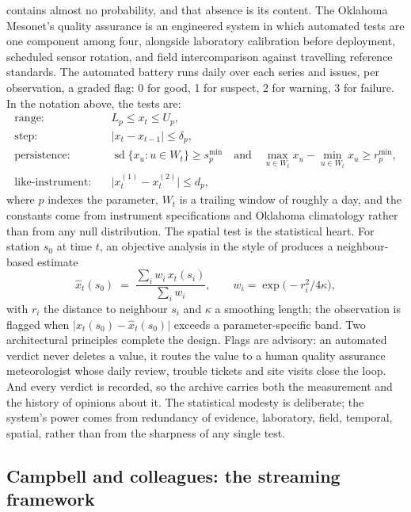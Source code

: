 \citet{shafer2000} contains almost no probability, and that absence is its
content. The Oklahoma Mesonet's quality assurance is an engineered system in
which automated tests are one component among four, alongside laboratory
calibration before deployment, scheduled sensor rotation, and field
intercomparison against travelling reference standards. The automated battery
runs daily over each series and issues, per observation, a graded flag:
0 for good, 1 for suspect, 2 for warning, 3 for failure. In the notation
above, the tests are:
\begin{align}
  \text{range:}\quad & L_p \le x_t \le U_p, \label{eq:range}\\
  \text{step:}\quad & \lvert x_t - x_{t-1} \rvert \le \delta_p, \label{eq:step}\\
  \text{persistence:}\quad & \operatorname{sd}\{x_u : u \in W_t\} \ge
    s^{\min}_p \quad\text{and}\quad
    \max_{u \in W_t} x_u - \min_{u \in W_t} x_u \ge r^{\min}_p,
    \label{eq:persistence}\\
  \text{like-instrument:}\quad & \lvert x^{(1)}_t - x^{(2)}_t \rvert \le d_p,
    \label{eq:like}
\end{align}
where $p$ indexes the parameter, $W_t$ is a trailing window of roughly a
day, and the constants come from instrument specifications and Oklahoma
climatology rather than from any null distribution. The spatial test is the
statistical heart. For station $s_0$ at time $t$, an objective analysis in
the style of \citet{barnes1964} produces a neighbour-based estimate
\begin{equation}
  \hat{x}_t(s_0) \;=\;
  \frac{\sum_{i} w_i\, x_t(s_i)}{\sum_{i} w_i},
  \qquad w_i = \exp\!\big(-r_i^2 / 4\kappa\big),
  \label{eq:barnes}
\end{equation}
with $r_i$ the distance to neighbour $s_i$ and $\kappa$ a smoothing length;
the observation is flagged when $\lvert x_t(s_0) - \hat{x}_t(s_0)\rvert$
exceeds a parameter-specific band. Two architectural principles complete the
design. Flags are advisory: an automated verdict never deletes a value, it
routes the value to a human quality assurance meteorologist whose daily
review, trouble tickets and site visits close the loop. And every verdict is
recorded, so the archive carries both the measurement and the history of
opinions about it. The statistical modesty is deliberate; the system's power
comes from redundancy of evidence, laboratory, field, temporal, spatial,
rather than from the sharpness of any single test.

\subsection{Campbell and colleagues: the streaming framework}
\label{sec:tech-campbell}

